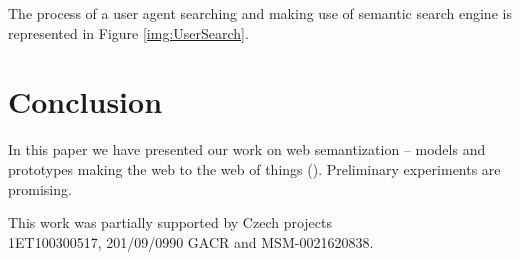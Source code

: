 \documentclass{www2009-submission}
\begin{document}
The process of a user agent searching and making use of semantic search engine is represented in Figure \ref{img:UserSearch}.





\section{Conclusion}
In this paper we have presented our work on web semantization -- models and prototypes making the web to the web of things (\cite{biblio:LeeWebThings}). Preliminary experiments are promising.

This work was partially supported by Czech projects\\1ET100300517, 201/09/0990 GACR and MSM-0021620838.

%



\balancecolumns %
\end{document}

